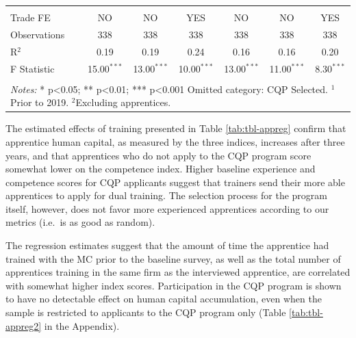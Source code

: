 \documentclass[
  11pt,
a4paper
]{report}
\begin{document}
\begin{adjustbox}{center}
\begin{table}[H]
\begin{tabular}{@{\extracolsep{-8pt}}lcccccc}
 \hline \\[-1.8ex] 
Trade FE & NO & NO & YES & NO & NO & YES \\ 
Observations & 338 & 338 & 338 & 338 & 338 & 338 \\ 
R$^{2}$ & 0.19 & 0.19 & 0.24 & 0.16 & 0.16 & 0.20 \\ 
F Statistic & 15.00$^{***}$ & 13.00$^{***}$ & 10.00$^{***}$ & 13.00$^{***}$ & 11.00$^{***}$ & 8.30$^{***}$ \\ 
\hline 
\hline \\[-1.8ex] 
\multicolumn{7}{l}{\parbox[t]{\textwidth}{\textit{Notes:} * p<0.05; ** p<0.01; *** p<0.001 \\ Omitted category: CQP Selected. \\ $^1$Prior to 2019. \\ $^2$Excluding apprentices.}} \\ 
\end{tabular} 
\end{table} 
\end{adjustbox}

\noindent The estimated effects of training presented in Table \ref{tab:tbl-appreg} confirm that apprentice human capital, as measured by the three indices, increases after three years, and that apprentices who do not apply to the CQP program score somewhat lower on the competence index. Higher baseline experience and competence scores for CQP applicants suggest that trainers send their more able apprentices to apply for dual training. The selection process for the program itself, however, does not favor more experienced apprentices according to our metrics (i.e.~is as good as random).

The regression estimates suggest that the amount of time the apprentice had trained with the MC prior to the baseline survey, as well as the total number of apprentices training in the same firm as the interviewed apprentice, are correlated with somewhat higher index scores. Participation in the CQP program is shown to have no detectable effect on human capital accumulation, even when the sample is restricted to applicants to the CQP program only (Table \ref{tab:tbl-appreg2} in the Appendix).
\end{document}
